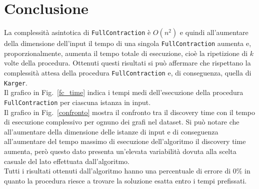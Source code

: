 \section{Conclusione}

%
%
%
%
%
%

La complessità asintotica di \texttt{FullContraction} è $O(n^2)$ e quindi all'aumentare della dimensione dell'input il tempo di una singola \texttt{FullContraction} aumenta e, proporzionalmente, aumenta il tempo totale di esecuzione, cioè la ripetizione di $k$ volte della procedura.
Ottenuti questi risultati si può affermare che rispettano la complessità attesa della procedura \texttt{FullContraction} e, di conseguenza, quella di \texttt{Karger}.\\
Il grafico in Fig.~\ref{fc_time} indica i tempi medi dell'esecuzione della procedura \texttt{FullContraction} per ciascuna istanza in input.\\
Il grafico in Fig.~\ref{confronto} mostra il confronto tra il discovery time con il tempo di esecuzione complessivo per ognuno dei grafi nel dataset. 
Si può notare che all'aumentare della dimensione delle istanze di input e di conseguenza all'aumentare del tempo massimo di esecuzione dell'algoritmo il discovery time aumenta, però questo dato presenta un'elevata variabilità dovuta alla scelta casuale del lato effettuata dall'algoritmo.\\
Tutti i risultati ottenuti dall'algoritmo hanno una percentuale di errore di $0\%$ in quanto la procedura riesce a trovare la soluzione esatta entro i tempi prefissati.

\pagebreak